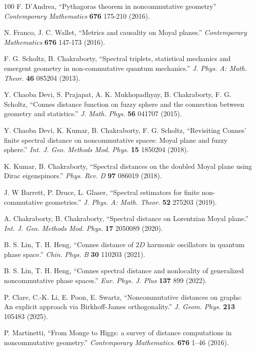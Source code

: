 \documentclass[a4paper,12pt]{article}
\begin{document}
\begin{thebibliography}{100}
	F. D'Andrea, ``Pythagoras theorem in noncommutative
	geometry'' \textit{Contemporary Mathematics}
	\textbf{676} 175-210 (2016).
	
	N. Franco, J. C. Wallet, ``Metrics and causality on Moyal
	planes.'' \textit{Contemporary Mathematics}
	\textbf{676} 147-173 (2016).
	
	F. G. Scholtz, B. Chakraborty, ``Spectral triplets,
	statistical mechanics and emergent geometry in non-commutative quantum
	mechanics.'' \textit{J. Phys. A: Math. Theor.}
	\textbf{46} 085204 (2013).
	
	Y. Chaoba Devi, S. Prajapat, A. K. Mukhopadhyay, B.
	Chakraborty, F. G. Scholtz, ``Connes distance function on fuzzy sphere and
	the connection between geometry and statistics.'' \textit{J. Math.
				Phys.} \textbf{56} 041707 (2015).
	
	Y. Chaoba Devi, K. Kumar, B. Chakraborty, F. G.
	Scholtz, ``Revisiting Connes' finite spectral distance on noncommutative
	spaces: Moyal plane and fuzzy sphere.'' \textit{Int. J. Geo. Methods
				Mod. Phys.} \textbf{15} 1850204 (2018).
	
	K. Kumar, B. Chakraborty, ``Spectral distances on the
	doubled Moyal plane using Dirac eigenspinors.'' \textit{Phys. Rev.
				D} \textbf{97} 086019 (2018).
	
	J. W Barrett, P. Druce, L. Glaser, ``Spectral estimators
	for finite non-commutative geometries.'' \textit{J. Phys. A: Math.
				Theor.} \textbf{52} 275203 (2019).
	
	A. Chakraborty, B. Chakraborty, ``Spectral distance
	on Lorentzian Moyal plane.'' \textit{Int. J. Geo. Methods Mod.
				Phys.} \textbf{17} 2050089 (2020).
				
	B. S. Lin, T. H. Heng, ``Connes distance of $2 D$ harmonic
oscillators in quantum phase space.'' \textit{Chin. Phys. B}
\textbf{30} 110203 (2021).
	
	B. S. Lin, T. H. Heng, ``Connes spectral distance and
	nonlocality of generalized noncommutative phase spaces.''
	\textit{Eur. Phys. J. Plus} \textbf{137} 899 (2022).
	
	P. Clare, C.-K. Li, E. Poon, E. Swartz, ``Noncommutative
	distances on graphs: An explicit approach via Birkhoff-James
	orthogonality.'' \textit{J. Geom. Phys.} \textbf{213}
	105483 (2025).

	 P. Martinetti, ``From Monge to Higgs: a survey of distance computations in noncommutative geometry.'' \textit{Contemporary Mathematics.} \textbf{676} 1--46 (2016).



\end{thebibliography}
\end{document}
